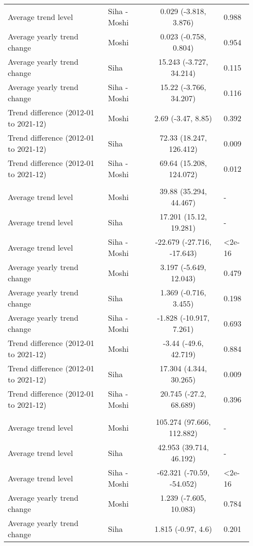 \begin{longtable}{l|lcl}
Average trend level & Siha - Moshi & 0.029 (-3.818, 3.876) & 0.988 \\ 
Average yearly trend change & Moshi & 0.023 (-0.758, 0.804) & 0.954 \\ 
Average yearly trend change & Siha & 15.243 (-3.727, 34.214) & 0.115 \\ 
Average yearly trend change & Siha - Moshi & 15.22 (-3.766, 34.207) & 0.116 \\ 
Trend difference (2012-01 to 2021-12) & Moshi & 2.69 (-3.47, 8.85) & 0.392 \\ 
Trend difference (2012-01 to 2021-12) & Siha & 72.33 (18.247, 126.412) & 0.009 \\ 
Trend difference (2012-01 to 2021-12) & Siha - Moshi & 69.64 (15.208, 124.072) & 0.012 \\ 
\midrule\addlinespace[2.5pt]
\multicolumn{4}{l}{Neuroses} \\ 
\midrule\addlinespace[2.5pt]
Average trend level & Moshi & 39.88 (35.294, 44.467) & - \\ 
Average trend level & Siha & 17.201 (15.12, 19.281) & - \\ 
Average trend level & Siha - Moshi & -22.679 (-27.716, -17.643) & <2e-16 \\ 
Average yearly trend change & Moshi & 3.197 (-5.649, 12.043) & 0.479 \\ 
Average yearly trend change & Siha & 1.369 (-0.716, 3.455) & 0.198 \\ 
Average yearly trend change & Siha - Moshi & -1.828 (-10.917, 7.261) & 0.693 \\ 
Trend difference (2012-01 to 2021-12) & Moshi & -3.44 (-49.6, 42.719) & 0.884 \\ 
Trend difference (2012-01 to 2021-12) & Siha & 17.304 (4.344, 30.265) & 0.009 \\ 
Trend difference (2012-01 to 2021-12) & Siha - Moshi & 20.745 (-27.2, 68.689) & 0.396 \\ 
\midrule\addlinespace[2.5pt]
\multicolumn{4}{l}{Other Cardiovascular Diseases} \\ 
\midrule\addlinespace[2.5pt]
Average trend level & Moshi & 105.274 (97.666, 112.882) & - \\ 
Average trend level & Siha & 42.953 (39.714, 46.192) & - \\ 
Average trend level & Siha - Moshi & -62.321 (-70.59, -54.052) & <2e-16 \\ 
Average yearly trend change & Moshi & 1.239 (-7.605, 10.083) & 0.784 \\ 
Average yearly trend change & Siha & 1.815 (-0.97, 4.6) & 0.201 \\ 

\end{longtable}
